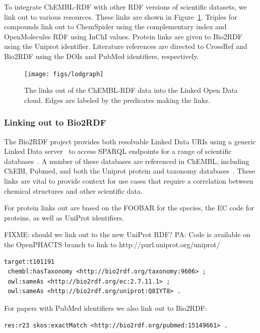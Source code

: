 \documentclass[10pt]{bmc_article}
\newenvironment{bmcformat}{\begin{raggedright}\baselineskip20pt\sloppy\setboolean{publ}{false}}{\end{raggedright}\baselineskip20pt\sloppy}
\begin{document}
\begin{bmcformat}
To integrate ChEMBL-RDF with other RDF versions of scientific datasets, we link out to various resources.
These links are shown in Figure~\ref{2}. Triples for compounds link out to ChemSpider 
using the complementary index and OpenMolecules RDF using InChI values. Protein links are given to Bio2RDF
using the Uniprot identifier. Literature references are directed to CrossRef and Bio2RDF 
using the DOIs and PubMed identifiers, respectively.

\begin{figure}[t]
{\center
\texttt{[image: figs/lodgraph]}
\caption{The links out of the ChEMBL-RDF data into the Linked Open Data cloud.
Edges are labeled by the predicates making the links.}\label{2}
}
\end{figure}

\subsubsection*{Linking out to Bio2RDF}

The Bio2RDF project provides both resolvable Linked Data URIs using a generic Linked Data
server~\cite{Ansell2011} to access SPARQL endpoints for a range of scientific databases~\cite{Belleau2008}.
A number of these databases are referenced in ChEMBL, including ChEBI, Pubmed, and both the
Uniprot protein and taxonomy databases~\cite{TheUniProtConsortium2010}. These links are
vital to provide context for use cases that require a correlation between chemical
structures and other scientific data. 

For protein links out are based on the FOOBAR for the species, the EC code for proteins,
as well as UniProt identifiers.

FIXME: should we link out to the new UniProt RDF? PA: Code is available on the OpenPHACTS branch to link to http://purl.uniprot.org/uniprot/

\begin{small}
\begin{verbatim}
target:t101191
 chembl:hasTaxonomy <http://bio2rdf.org/taxonomy:9606> ;
 owl:sameAs <http://bio2rdf.org/ec:2.7.11.1> ;
 owl:sameAs <http://bio2rdf.org/uniprot:Q8IYT8> .
\end{verbatim}
\end{small}

For papers with PubMed identifiers we also link out to Bio2RDF:

\begin{small}
\begin{verbatim}
res:r23 skos:exactMatch <http://bio2rdf.org/pubmed:15149661> .
\end{verbatim}
\end{small}


\end{bmcformat}
\end{document}
